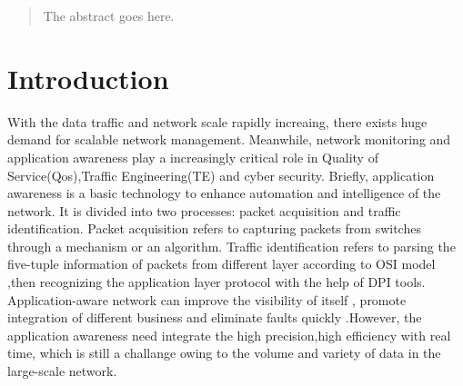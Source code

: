 \documentclass[conference,compsoc]{IEEEtran}
\begin{document}




\maketitle

\begin{abstract}
The abstract goes here.
\end{abstract}





%
\IEEEpeerreviewmaketitle



\section{Introduction}

With the data traffic and network scale rapidly increaing, there exists huge demand for scalable network management. Meanwhile, network monitoring and application awareness play a increasingly critical role in Quality of Service(Qos),Traffic Engineering(TE) and cyber security.
Briefly, application awareness is a basic technology to enhance  automation and intelligence of the network. It is divided into two processes: packet acquisition and traffic identification. Packet acquisition refers to capturing packets from switches through a mechanism or an algorithm. Traffic identification refers to parsing the five-tuple information of packets from different layer according to OSI model ,then  recognizing the application layer protocol with the help of DPI tools. Application-aware network can improve the visibility of itself , promote integration of different business and eliminate  faults quickly .However, the application awareness need integrate the high precision,high efficiency with real time, which is still a challange owing to the volume and variety of data in the large-scale network.
\end{document}
